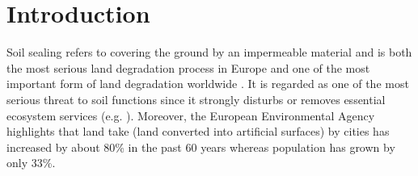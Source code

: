 \documentclass[APA,LATO1COL,doublespace]{WileyNJD-v2}
\newcommand{\toberevised}[1]{\emph{\textcolor{red}{#1}}} %
\begin{document}
\section{Introduction}\label{sec1}
Soil sealing refers to covering the ground by an impermeable material and is both the most serious land degradation process in Europe and one of the most important form of land degradation worldwide \citep{FAO15}.
It is regarded as one of the most serious threat to soil functions since it strongly disturbs or removes essential ecosystem services (e.g. \citealp{Calzolari16,Dunbar13}).
Moreover, the European Environmental Agency \citep{EEA2011} highlights that land take (land converted into artificial surfaces) by cities has increased by about 80\% in the past 60 years whereas population has grown by only 33\%.
\end{document}

